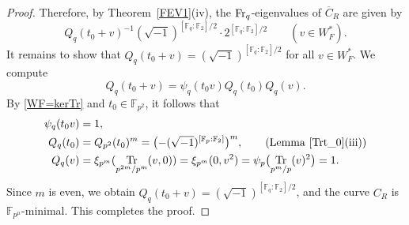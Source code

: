 \documentclass[12pt,a4paper]{amsart}
\theoremstyle{definition}
\def\F{{\mathbb F}}
\theoremstyle{remark}
\DeclareMathOperator{\Tr}{Tr}
\begin{document}
\begin{proof}
Therefore, by Theorem~\ref{FEV1}(iv), the ${\rm Fr}_q$-eigenvalues of $\overline{C}_R$ are given by 
\[
Q_q(t_0+v)^{-1}(\sqrt{-1})^{[\F_q:\F_2]/2}\cdot 2^{[\F_q:\F_2]/2}\qquad (v\in W_F^\ast). 
\]
It remains to show that $Q_q(t_0+v)=(\sqrt{-1})^{[\F_q:\F_2]/2}$ for all $v\in W_F^\ast$. 
We compute 
\[
Q_q(t_0+v)=\psi_q(t_0v)Q_q(t_0)Q_q(v). 
\]
By \eqref{WF=kerTr} and $t_0\in\F_{p^2}$, it follows that  
\begin{align*}
\psi_q(t_0v)&=1,\\
    Q_q(t_0)&=Q_{p^2}(t_0)^m=\bigl(-(\sqrt{-1})^{[\F_p:\F_2]}\bigr)^m,\qquad(\text{Lemma~\ref{Trt_0}(iii)})\\
    Q_q(v)&=\xi_{p^m}(\Tr_{p^{2m}/p^m}(v,0))=\xi_{p^m}(0,v^2)=\psi_p\bigl(\Tr_{p^m/p}(v)^2\bigr)=1. 
\end{align*}
Since $m$ is even, we obtain $Q_q(t_0+v)=(\sqrt{-1})^{[\F_q:\F_2]/2}$, and the curve $C_R$ is $\F_{p^\mu}$-minimal. This completes the proof. 
\end{proof}
\end{document}
